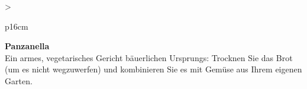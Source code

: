 \documentclass[
  beamerpaper,
  DIV=11,
  numbers=noendperiod,
  aspectratio=54]{scrreprt}
\begin{document}
\begin{table}

\caption{\label{tbl-panel-panza}Panzanella}\begin{minipage}[t]{\linewidth}

\tabularnewline

\fontsize{16}{18}\selectfont
\begin{tabular}{>{\raggedright\arraybackslash}p{16cm}}
\toprule
\begingroup\fontsize{18}{20}\selectfont \textbf{Panzanella}\endgroup\\
\midrule
Ein armes, vegetarisches Gericht bäuerlichen Ursprungs: Trocknen Sie das Brot (um es nicht wegzuwerfen) und kombinieren Sie es mit Gemüse aus Ihrem eigenen Garten.\\
\bottomrule
\end{tabular}

\end{minipage}%
\newline
\begin{minipage}[t]{\linewidth}


\end{minipage}%

\end{table}

\break
\end{document}
